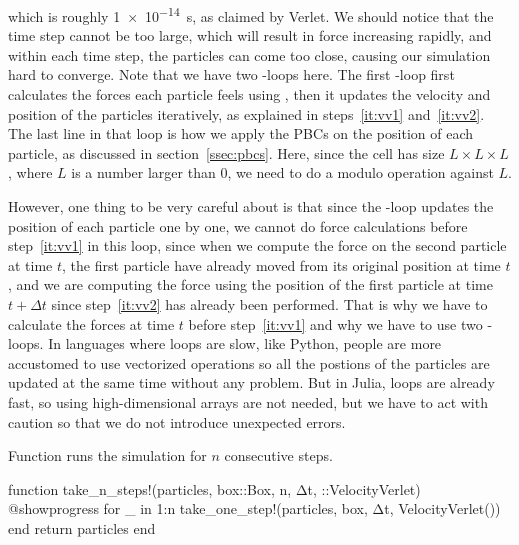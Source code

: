 %
which is roughly \qty{1e-14}{\second}, as claimed by Verlet\cite{Verlet}.
We should notice that the time step cannot be too large, which will result in force
increasing rapidly, and within each time step, the particles can come too close,
causing our simulation hard to converge.
Note that we have two -loops here. The first -loop first calculates
the forces each particle feels using , then it updates
the velocity and position of the particles iteratively, as explained in steps~\ref{it:vv1}
and~\ref{it:vv2}.
The last line in that loop is how we apply the PBCs on the position of each particle,
as discussed in section~\ref{ssec:pbcs}.
Here, since the cell has size \(L \times L \times L\), where \(L\) is a number larger than
\(0\), we need to do a modulo operation against \(L\).

However, one thing to be very careful about is that since the -loop updates
the position of each particle one by one, we cannot do force calculations before
step~\ref{it:vv1} in this loop,
since when we compute the force on the second particle at time \(t\), the first particle
have already moved from its original position at time \(t\), and we are computing the force
using the position of the first particle at time \(t + \Delta t\) since step~\ref{it:vv2}
has already been performed.
That is why we have to calculate the forces at time \(t\) before step~\ref{it:vv1} and
why we have to use two -loops.
In languages where loops are slow, like Python, people are more accustomed to use
vectorized operations so all the postions of the particles are updated at the same time
without any problem.
But in Julia, loops are already fast, so using high-dimensional arrays are not needed,
but we have to act with caution so that we do not introduce unexpected errors.

\begin{algorithm}
    \caption{Function  runs the simulation for \(n\) consecutive steps.}
    \label{lst:take_n_steps}
    \begin{juliacode}
        function take_n_steps!(particles, box::Box, n, Δt, ::VelocityVerlet)
            @showprogress for _ in 1:n
                take_one_step!(particles, box, Δt, VelocityVerlet())
            end
            return particles
        end
    \end{juliacode}
\end{algorithm}

